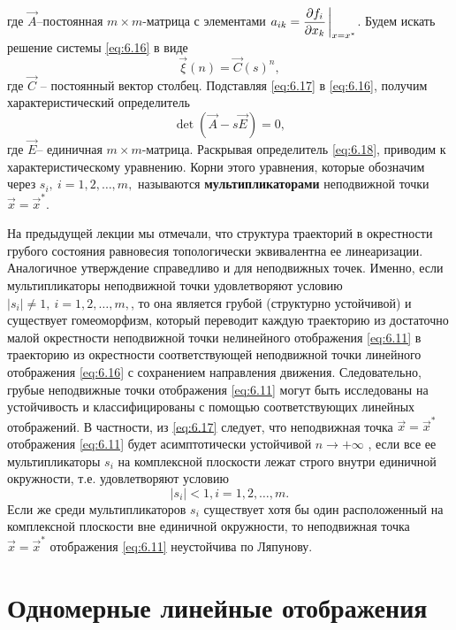 где $\vec A$--постоянная $m \times m$-матрица с элементами $\displaystyle a_{ik} = \pdv{f_i}{x_k} \eval_{x=x^*}$. Будем искать решение системы \eqref{eq:6.16} в виде
\begin{equation}
        \label{eq:6.17}
        \vec{\xi}(n) = \vec C (s)^n,
\end{equation}
где $\vec C$ -- постоянный вектор столбец. Подставляя \eqref{eq:6.17} в \eqref{eq:6.16}, получим характеристический определитель
\begin{equation}
        \label{eq:6.18}
        \det(\vec A - s \vec E) = 0,
\end{equation}
где $\vec E$-- единичная $m \times m$-матрица. Раскрывая определитель \eqref{eq:6.18}, приводим к характеристическому уравнению. Корни этого уравнения, которые обозначим через $s_{i},~ i=1,2,\dots,m,$ называются \textbf{мультипликаторами} неподвижной точки $\vec x = \vec x^*$.

На предыдущей лекции мы отмечали, что структура траекторий в
окрестности грубого состояния равновесия топологически эквивалентна ее
линеаризации. Аналогичное утверждение справедливо и для неподвижных
точек. Именно, если мультипликаторы неподвижной точки удовлетворяют
условию  $|s_i| \neq 1,~ i=1,2,\dots,m,$, то она является грубой (структурно устойчивой) и
существует гомеоморфизм, который переводит каждую траекторию из
достаточно малой окрестности неподвижной точки нелинейного отображения
\eqref{eq:6.11} в траекторию из окрестности соответствующей неподвижной точки
линейного отображения \eqref{eq:6.16} с сохранением направления движения.
Следовательно, грубые неподвижные точки отображения \eqref{eq:6.11} могут быть
исследованы на устойчивость и классифицированы с помощью
соответствующих линейных отображений. В частности, из \eqref{eq:6.17} следует, что
неподвижная точка
$\vec x = \vec x^*$ отображения \eqref{eq:6.11} будет асимптотически
устойчивой $n \to + \infty$ , если все ее мультипликаторы
$s_i$ 
 на комплексной
плоскости лежат строго внутри единичной окружности, т.е. удовлетворяют
условию
\begin{equation}
        \label{eq:6.19}
        |s_i| < 1, i = 1,2,\dots,m.
\end{equation}
Если же среди мультипликаторов $s_i$ существует хотя бы один расположенный на комплексной плоскости вне единичной окружности, то неподвижная точка $\vec x = \vec x^*$ отображения \eqref{eq:6.11} неустойчива по Ляпунову.

\section{Одномерные линейные отображения}%
\label{sec:6.4}

